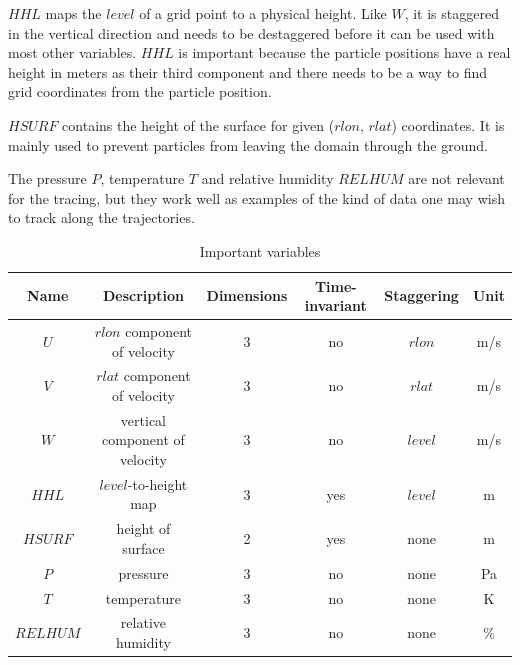 $HHL$ maps the $level$ of a grid point to a physical height. Like $W$, it is staggered in the vertical direction and needs to be destaggered before it can be used with most other variables. $HHL$ is important because the particle positions have a real height in meters as their third component and there needs to be a way to find grid coordinates from the particle position.

$HSURF$ contains the height of the surface for given ($rlon$, $rlat$) coordinates. It is mainly used to prevent particles from leaving the domain through the ground.

The pressure $P$, temperature $T$ and relative humidity $RELHUM$ are not relevant for the tracing, but they work well as examples of the kind of data one may wish to track along the trajectories.

\begin{table}
\centering
\begin{tabular}{|c|c|c|c|c|c|}
\hline
Name & Description & Dimensions & Time-invariant & Staggering & Unit \\ \hline
$U$ & $rlon$ component of velocity & 3 & no & $rlon$ & m/s \\ \hline
$V$ & $rlat$ component of velocity & 3 & no & $rlat$ & m/s \\ \hline
$W$ & vertical component of velocity & 3 & no & $level$ & m/s \\ \hline
$HHL$ & $level$-to-height map & 3 & yes & $level$ & m \\ \hline
$HSURF$ & height of surface & 2 & yes & none & m \\ \hline
$P$ & pressure & 3 & no & none & Pa \\ \hline
$T$ & temperature & 3 & no & none & K \\ \hline
$RELHUM$ & relative humidity & 3 & no & none & \% \\ \hline
\end{tabular}
\caption{Important variables}
\label{tab:variables}
\end{table}

